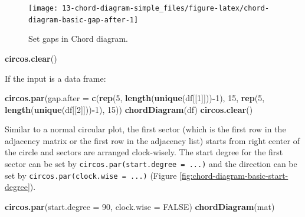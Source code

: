 \documentclass[]{book}
\newenvironment{Shaded}{\begin{snugshade}}{\end{snugshade}}
\newcommand{\KeywordTok}[1]{\textcolor[rgb]{0.13,0.29,0.53}{\textbf{#1}}}
\newcommand{\DataTypeTok}[1]{\textcolor[rgb]{0.13,0.29,0.53}{#1}}
\newcommand{\DecValTok}[1]{\textcolor[rgb]{0.00,0.00,0.81}{#1}}
\newcommand{\OtherTok}[1]{\textcolor[rgb]{0.56,0.35,0.01}{#1}}
\newcommand{\OperatorTok}[1]{\textcolor[rgb]{0.81,0.36,0.00}{\textbf{#1}}}
\newcommand{\NormalTok}[1]{#1}
\theoremstyle{definition}
\theoremstyle{definition}
\theoremstyle{remark}
\begin{document}
\begin{figure}

{\centering \texttt{[image: 13-chord-diagram-simple\_files/figure-latex/chord-diagram-basic-gap-after-1]} 

}

\caption{Set gaps in Chord diagram.}\label{fig:chord-diagram-basic-gap-after}
\end{figure}

\begin{Shaded}
\begin{Highlighting}[]
\KeywordTok{circos.clear}\NormalTok{()}
\end{Highlighting}
\end{Shaded}

If the input is a data frame:

\begin{Shaded}
\begin{Highlighting}[]
\KeywordTok{circos.par}\NormalTok{(}\DataTypeTok{gap.after =} \KeywordTok{c}\NormalTok{(}\KeywordTok{rep}\NormalTok{(}\DecValTok{5}\NormalTok{, }\KeywordTok{length}\NormalTok{(}\KeywordTok{unique}\NormalTok{(df[[}\DecValTok{1}\NormalTok{]]))}\OperatorTok{-}\DecValTok{1}\NormalTok{), }\DecValTok{15}\NormalTok{, }
                         \KeywordTok{rep}\NormalTok{(}\DecValTok{5}\NormalTok{, }\KeywordTok{length}\NormalTok{(}\KeywordTok{unique}\NormalTok{(df[[}\DecValTok{2}\NormalTok{]]))}\OperatorTok{-}\DecValTok{1}\NormalTok{), }\DecValTok{15}\NormalTok{))}
\KeywordTok{chordDiagram}\NormalTok{(df)}
\KeywordTok{circos.clear}\NormalTok{()}
\end{Highlighting}
\end{Shaded}

Similar to a normal circular plot, the first sector (which is the first
row in the adjacency matrix or the first row in the adjacency list)
starts from right center of the circle and sectors are arranged
clock-wisely. The start degree for the first sector can be set by
\texttt{circos.par(start.degree\ =\ ...)} and the direction can be set
by \texttt{circos.par(clock.wise\ =\ ...)} (Figure
\ref{fig:chord-diagram-basic-start-degree}).

\begin{Shaded}
\begin{Highlighting}[]
\KeywordTok{circos.par}\NormalTok{(}\DataTypeTok{start.degree =} \DecValTok{90}\NormalTok{, }\DataTypeTok{clock.wise =} \OtherTok{FALSE}\NormalTok{)}
\KeywordTok{chordDiagram}\NormalTok{(mat)}
\end{Highlighting}
\end{Shaded}
\end{document}
